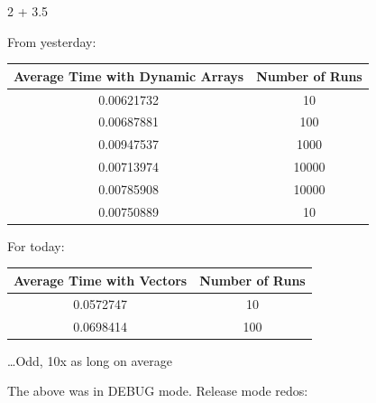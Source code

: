 \documentclass[12pt,hyperref]{labbook}
\begin{document}
2 + 3.5


From yesterday:


\begin{table}[H]
    \centering
    \begin{tabular}{|c|c|}
        \hline
        \textbf{Average Time with Dynamic Arrays} & \textbf{Number of Runs} \\
        \hline
        0.00621732 & 10 \\
        0.00687881 & 100 \\
        0.00947537 & 1000 \\
        0.00713974 & 10000 \\
        0.00785908 & 10000 \\
        0.00750889 & 10 \\
        \hline
    \end{tabular}
\end{table}

For today:

\begin{table}[H]
    \centering
    \begin{tabular}{|c|c|}
        \hline
        \textbf{Average Time with Vectors} & \textbf{Number of Runs} \\
        \hline
        0.0572747 & 10 \\
        0.0698414 & 100\\
        \hline
    \end{tabular}
\end{table}

…Odd, 10x as long on average

The above was in DEBUG mode. Release mode redos:
\end{document}
